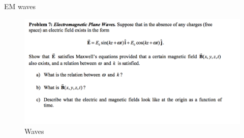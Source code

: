 \documentclass[makesolutionspdf]{esg8022pset}
\begin{document}
\begin{problem}{EM waves}
\begin{figure}[H]
    \centering
    \includegraphics[width = 15cm]{waves2}
   \caption{Waves}
  \end{figure}
\end{problem}
\end{document}
